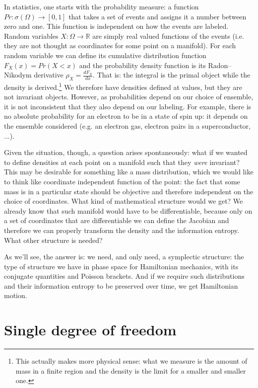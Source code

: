 \documentclass[smallextended]{svjour3}
\numberwithin{equation}{section}
\theoremstyle{definition}
\begin{document}
In statistics, one starts with the probability measure: a function $Pr : \sigma(\Omega) \rightarrow [0,1]$ that takes a set of events and assigns it a number between zero and one. This function is independent on how the events are labeled. Random variables $X : \Omega \rightarrow \mathbb{R}$ are simply real valued functions of the events (i.e. they are not thought as coordinates for some point on a manifold). For each random variable we can define its cumulative distribution function $F_X(x)=Pr(X<x)$ and the probability density function is its Radon–Nikodym derivative $\rho_X = \frac{dF_X}{dx}$. That is: the integral is the primal object while the density is derived.\footnote{This actually makes more physical sense: what we measure is the amount of mass in a finite region and the density is the limit for a smaller and smaller one.} We therefore have densities defined at values, but they are not invariant objects. However, as probabilities depend on our choice of ensemble, it is not inconsistent that they also depend on our labeling. For example, there is no absolute probability for an electron to be in a state of spin up: it depends on the ensemble considered (e.g. an electron gas, electron pairs in a superconductor, ...).

Given the situation, though, a question arises spontaneously: what if we wanted to define densities at each point on a manifold such that they \emph{were} invariant? This may be desirable for something like a mass distribution, which we would like to think like coordinate independent function of the point: the fact that some mass is in a particular state should be objective and therefore independent on the choice of coordinates. What kind of mathematical structure would we get? We already know that such manifold would have to be differentiable, because only on a set of coordinates that are differentiable we can define the Jacobian and therefore we can properly transform the density and the information entropy. What other structure is needed?

As we'll see, the answer is: we need, and only need, a symplectic structure: the type of structure we have in phase space for Hamiltonian mechanics, with its conjugate quantities and Poisson brackets. And if we require such distributions and their information entropy to be preserved over time, we get Hamiltonian motion.

\section{Single degree of freedom}
\end{document}
